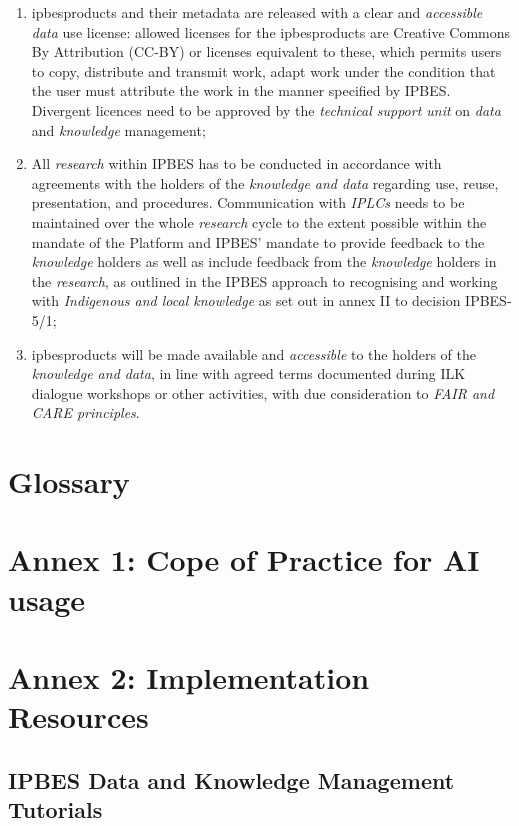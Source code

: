 \documentclass{article}
\begin{document}
\begin{enumerate}[label=(\alph*)]
    \item \gls{ipbesproducts} and their metadata are released with a clear and \textit{accessible data} use license: allowed licenses for the \gls{ipbesproducts} are Creative Commons By Attribution (CC-BY) or licenses equivalent to these, which permits users to copy, distribute and transmit work, adapt work under the condition that the user must attribute the work in the manner specified by IPBES. Divergent licences need to be approved by the \textit{technical support unit} on \textit{data} and \textit{knowledge} management;

    \item All \textit{research} within IPBES has to be conducted in accordance with agreements with the holders of the \textit{knowledge and data }regarding use, reuse, presentation, and procedures. Communication with \textit{IPLCs} needs to be maintained over the whole \textit{research} cycle to the extent possible within the mandate of the Platform and IPBES’ mandate to provide feedback to the \textit{knowledge} holders as well as include feedback from the \textit{knowledge} holders in the \textit{research}, as outlined in the IPBES approach to recognising and working with \textit{Indigenous and local knowledge} as set out in annex II to decision IPBES-5/1;

    \item \gls{ipbesproducts} will be made available and \textit{accessible} to the holders of the \textit{knowledge and data}, in line with agreed terms documented during ILK dialogue workshops or other activities, with due consideration to \textit{FAIR and CARE principles}.
\end{enumerate}




\section{Glossary}

\printglossary

\section{Annex 1: Cope of Practice for AI usage}

\section{Annex 2: Implementation Resources}

\subsection{IPBES Data and Knowledge Management Tutorials}
\end{document}
